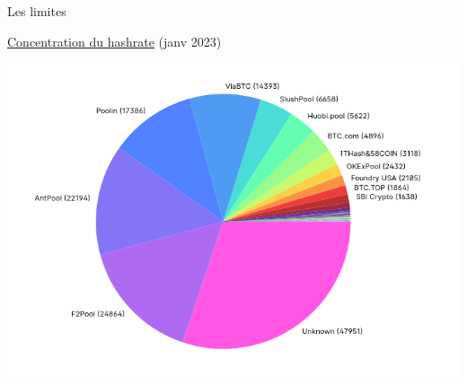\documentclass[presentation]{beamer}
\begin{document}
\begin{frame}[label={sec:org7eec08b}]{Les limites}
\begin{block}{\href{https://www.blockchain.com/charts/pools}{Concentration du hashrate} (janv 2023)}
\begin{center}
\includegraphics[width=.6\textwidth]{Pictures/hashrate_distrib_jan23.png}
\end{center}
\end{block}


\end{frame}
\end{document}
